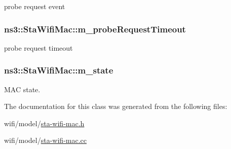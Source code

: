 probe request event 

\subsubsection[{\texorpdfstring{m\+\_\+probe\+Request\+Timeout}{m_probeRequestTimeout}}]{ ns3\+::\+Sta\+Wifi\+Mac\+::m\+\_\+probe\+Request\+Timeout\hspace{0.3cm}{\ttfamily [private]}}\hypertarget{classns3_1_1StaWifiMac_acd3c1903e18cd6b544fa4d373f970613}{}\label{classns3_1_1StaWifiMac_acd3c1903e18cd6b544fa4d373f970613}


probe request timeout 

\subsubsection[{\texorpdfstring{m\+\_\+state}{m_state}}]{ ns3\+::\+Sta\+Wifi\+Mac\+::m\+\_\+state\hspace{0.3cm}{\ttfamily [private]}}\hypertarget{classns3_1_1StaWifiMac_aa5739fb8521d45d18509f066b6872e66}{}\label{classns3_1_1StaWifiMac_aa5739fb8521d45d18509f066b6872e66}


M\+AC state. 



The documentation for this class was generated from the following files\+:\begin{DoxyCompactItemize}
\item 
wifi/model/\hyperlink{sta-wifi-mac_8h}{sta-\/wifi-\/mac.\+h}\item 
wifi/model/\hyperlink{sta-wifi-mac_8cc}{sta-\/wifi-\/mac.\+cc}\end{DoxyCompactItemize}
